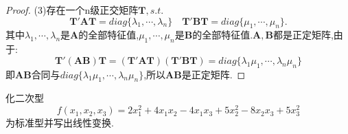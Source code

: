 \documentclass[lang=cn,11pt,normal]{elegantbook}
\renewcommand{\AA}{\boldsymbol{A}}
\newcommand{\BB}{\boldsymbol{B}}
\newcommand{\TT}{\boldsymbol{T}}
\begin{document}
	\begin{proof}
		(3)存在一个n级正交矩阵$\TT,s.t.$
		\begin{equation}
		\TT'\boldsymbol{AT}=diag\{\lambda_1,\cdots,\lambda_n\}\quad\TT'\boldsymbol{BT}=diag\{\mu_1,\cdots,\mu_n\}.
		\end{equation}
		其中$\lambda_1,\cdots,\lambda_n$是$\AA$的全部特征值,$\mu_1,\cdots,\mu_n$是$\BB$的全部特征值.$\AA,\BB$都是正定矩阵,由于:
		\begin{equation}
		\TT'(\boldsymbol{AB})\TT=(\TT'\boldsymbol{AT})(\TT'\boldsymbol{BT})=diag\{\lambda_1\mu_1,\cdots,\lambda_n\mu_n \}
		\end{equation}
		即$\boldsymbol{AB}$合同与$diag\{\lambda_1\mu_1,\cdots,\lambda_n\mu_n \}$,所以$\boldsymbol{AB}$是正定矩阵.
	\end{proof}
	\begin{exercise}
		化二次型
		\begin{equation}
		f(x_1,x_2,x_3)=2x_1^2+4x_1x_2-4x_1x_3+5x_2^2-8x_2x_3+5x_3^2
		\end{equation}
		为标准型并写出线性变换.
	\end{exercise}
\end{document}
